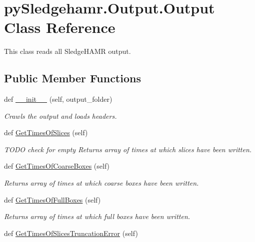 \hypertarget{classpySledgehamr_1_1Output_1_1Output}{}\section{py\+Sledgehamr.\+Output.\+Output Class Reference}
\label{classpySledgehamr_1_1Output_1_1Output}


This class reads all Sledge\+H\+A\+MR output.  


\subsection*{Public Member Functions}
\begin{DoxyCompactItemize}
\item 
def \mbox{\hyperlink{classpySledgehamr_1_1Output_1_1Output_a853e2158e6cedd7993bc2e4bbe695ca0}{\+\_\+\+\_\+init\+\_\+\+\_\+}} (self, output\+\_\+folder)
\begin{DoxyCompactList}\small\item\em Crawls the output and loads headers. \end{DoxyCompactList}\item 
def \mbox{\hyperlink{classpySledgehamr_1_1Output_1_1Output_a71efe664fd35cd779c2502a151bfe268}{Get\+Times\+Of\+Slices}} (self)
\begin{DoxyCompactList}\small\item\em T\+O\+DO check for empty Returns array of times at which slices have been written. \end{DoxyCompactList}\item 
def \mbox{\hyperlink{classpySledgehamr_1_1Output_1_1Output_ac16b3f4a9fac891e73a2f87369c39866}{Get\+Times\+Of\+Coarse\+Boxes}} (self)
\begin{DoxyCompactList}\small\item\em Returns array of times at which coarse boxes have been written. \end{DoxyCompactList}\item 
def \mbox{\hyperlink{classpySledgehamr_1_1Output_1_1Output_abb7dc1b390f68ca4c62eab187dfcf5a6}{Get\+Times\+Of\+Full\+Boxes}} (self)
\begin{DoxyCompactList}\small\item\em Returns array of times at which full boxes have been written. \end{DoxyCompactList}\item 
def \mbox{\hyperlink{classpySledgehamr_1_1Output_1_1Output_a020d7c9eae9e35ab306f6709527d0349}{Get\+Times\+Of\+Slices\+Truncation\+Error}} (self)

\end{DoxyCompactItemize}
